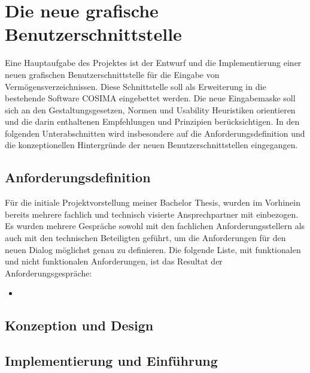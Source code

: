\section{Die neue grafische Benutzerschnittstelle}
Eine Hauptaufgabe des Projektes ist der Entwurf und die Implementierung einer neuen grafischen Benutzerschnittstelle für die Eingabe von Vermögensverzeichnissen. Diese Schnittstelle soll als Erweiterung in die bestehende Software COSIMA eingebettet werden. Die neue Eingabemaske soll sich an den Gestaltungsgesetzen, Normen und Usability Heuristiken orientieren und die darin enthaltenen Empfehlungen und Prinzipien berücksichtigen.
In den folgenden Unterabschnitten wird insbesondere auf die Anforderungsdefinition und die konzeptionellen Hintergründe der neuen Benutzerschnittstellen eingegangen.

\subsection{Anforderungsdefinition}
Für die initiale Projektvorstellung meiner Bachelor Thesis, wurden im Vorhinein bereits mehrere fachlich und technisch visierte Ansprechpartner mit einbezogen. Es wurden mehrere Gespräche sowohl mit den fachlichen Anforderungsstellern als auch mit den technischen Beteiligten geführt, um die Anforderungen für den neuen Dialog möglichst genau zu definieren. Die folgende Liste, mit funktionalen und nicht funktionalen Anforderungen, ist das Resultat der Anforderungsgespräche:
\begin{itemize}
	\item 
\end{itemize}


\subsection{Konzeption und Design}

\subsection{Implementierung und Einführung}
